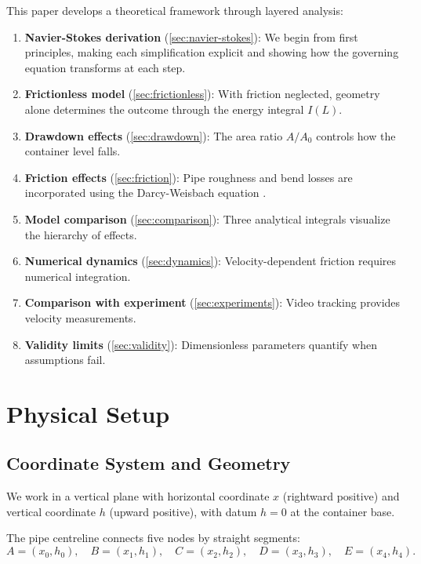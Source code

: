 \documentclass[11pt,a4paper]{article}
\theoremstyle{definition}
\begin{document}
This paper develops a theoretical framework through layered analysis:
\begin{enumerate}[nosep,leftmargin=2em]
  \item \textbf{Navier-Stokes derivation} (\cref{sec:navier-stokes}): We begin from first principles, making each simplification explicit and showing how the governing equation transforms at each step.
  \item \textbf{Frictionless model} (\cref{sec:frictionless}): With friction neglected, geometry alone determines the outcome through the energy integral $I(L)$.
  \item \textbf{Drawdown effects} (\cref{sec:drawdown}): The area ratio $A/A_0$ controls how the container level falls.
  \item \textbf{Friction effects} (\cref{sec:friction}): Pipe roughness and bend losses are incorporated using the Darcy-Weisbach equation \citep{brown2002history}.
  \item \textbf{Model comparison} (\cref{sec:comparison}): Three analytical integrals visualize the hierarchy of effects.
  \item \textbf{Numerical dynamics} (\cref{sec:dynamics}): Velocity-dependent friction requires numerical integration.
  \item \textbf{Comparison with experiment} (\cref{sec:experiments}): Video tracking provides velocity measurements.
  \item \textbf{Validity limits} (\cref{sec:validity}): Dimensionless parameters quantify when assumptions fail.
\end{enumerate}

\section{Physical Setup}
\label{sec:setup}

\subsection{Coordinate System and Geometry}

We work in a vertical plane with horizontal coordinate $x$ (rightward positive) and vertical coordinate $h$ (upward positive), with datum $h = 0$ at the container base.

The pipe centreline connects five nodes by straight segments:
\begin{equation}
  A = (x_0, h_0), \quad B = (x_1, h_1), \quad C = (x_2, h_2), \quad D = (x_3, h_3), \quad E = (x_4, h_4).
  \label{eq:nodes}
\end{equation}
\end{document}
